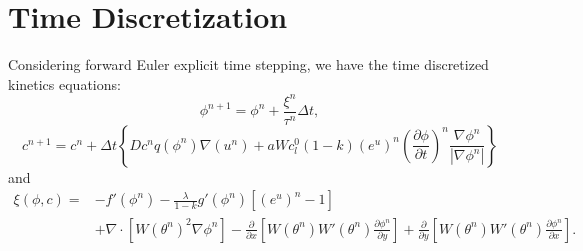 \documentclass[10pt]{article}
\begin{document}
\section{Time Discretization}
Considering forward Euler explicit time stepping, we have the time discretized kinetics equations:
\begin{equation}
\phi^{n+1}=\phi^{n} + \frac{\xi^n}{\tau^n}\Delta t,
\end{equation}
\begin{equation}
c^{n+1}=c^{n}+\Delta t \left \{ D c^n q(\phi^n)\nabla(u^n) + aWc_l^0(1-k)(e^u)^n \left(\frac{\partial \phi}{\partial t}\right)^n\frac{\nabla \phi^n}{|\nabla \phi^n|} \right \} 
\end{equation}
and
\begin{equation}
\begin{split}
\xi(\phi,c) = & -f'(\phi^n) - \frac{\lambda}{1-k} g'(\phi^n)[(e^u)^n - 1]\\
& + \nabla \cdot [W(\theta^n)^2\nabla \phi^n]-\frac{\partial}{\partial x} \left[W(\theta^n)W'(\theta^n)\frac{\partial \phi^n}{\partial y}\right] + \frac{\partial}{\partial y} \left[W(\theta^n)W'(\theta^n)\frac{\partial \phi^n}{\partial x}\right].
\end{split}
\end{equation}
\end{document}
